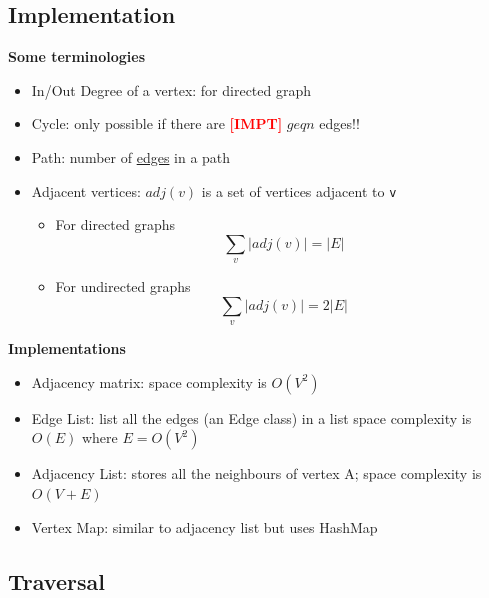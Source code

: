 \documentclass{article}
\newcommand{\impt}[0]{\textcolor{red}{\textbf{[IMPT] }}}
\begin{document}
\begin{multicols}{2}
\subsection{Implementation}
\textbf{Some terminologies}
\begin{itemize}
	\item In/Out Degree of a vertex: for directed graph
	\item Cycle: only possible if there are \impt $geq n$ edges!!
	\item Path: number of \underline{edges} in a path
	\item Adjacent vertices: $adj(v)$ is a set of vertices adjacent to \texttt{v}
	\begin{itemize}
		\item For directed graphs
		$$\sum_v|adj(v)| = |E|$$
		\item For undirected graphs
		$$\sum_v|adj(v)| = 2|E|$$
	\end{itemize}
\end{itemize}
\textbf{Implementations}
\begin{itemize}
	\item Adjacency matrix: space complexity is $O(V^2)$
	\item Edge List: list all the edges (an Edge class) in a list space complexity is $O(E)$ where $E = O(V^2)$
	\item Adjacency List: stores all the neighbours of vertex A; space complexity is $O(V+E)$
	\item Vertex Map: similar to adjacency list but uses HashMap
\end{itemize}

\subsection{Traversal}

\end{multicols}
\end{document}
